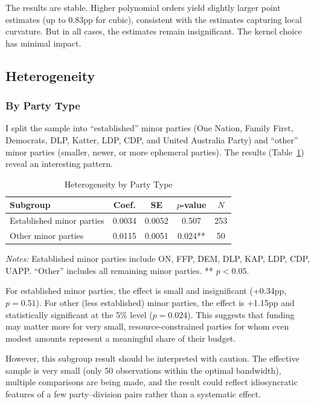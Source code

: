 \documentclass[12pt, a4paper]{article}
\begin{document}
The results are stable. Higher polynomial orders yield slightly larger point estimates (up to 0.83pp for cubic), consistent with the estimates capturing local curvature. But in all cases, the estimates remain insignificant. The kernel choice has minimal impact.

\subsection{Heterogeneity}

\subsubsection{By Party Type}

I split the sample into ``established'' minor parties (One Nation, Family First, Democrats, DLP, Katter, LDP, CDP, and United Australia Party) and ``other'' minor parties (smaller, newer, or more ephemeral parties). The results (Table~\ref{tab:heterogeneity}) reveal an interesting pattern.

\begin{table}[H]
\centering
\caption{Heterogeneity by Party Type}
\label{tab:heterogeneity}
\begin{tabular}{lcccc}
\toprule
\textbf{Subgroup} & \textbf{Coef.} & \textbf{SE} & \textbf{$p$-value} & \textbf{$N$} \\
\midrule
Established minor parties & 0.0034 & 0.0052 & 0.507 & 253 \\
Other minor parties & 0.0115 & 0.0051 & 0.024** & 50 \\
\bottomrule
\end{tabular}
\begin{minipage}{\textwidth}
\vspace{0.3em}
\footnotesize
\textit{Notes:} Established minor parties include ON, FFP, DEM, DLP, KAP, LDP, CDP, UAPP. ``Other'' includes all remaining minor parties. ** $p < 0.05$.
\end{minipage}
\end{table}

For established minor parties, the effect is small and insignificant (+0.34pp, $p = 0.51$). For other (less established) minor parties, the effect is +1.15pp and statistically significant at the 5\% level ($p = 0.024$). This suggests that funding may matter more for very small, resource-constrained parties for whom even modest amounts represent a meaningful share of their budget.

However, this subgroup result should be interpreted with caution. The effective sample is very small (only 50 observations within the optimal bandwidth), multiple comparisons are being made, and the result could reflect idiosyncratic features of a few party--division pairs rather than a systematic effect.
\end{document}
